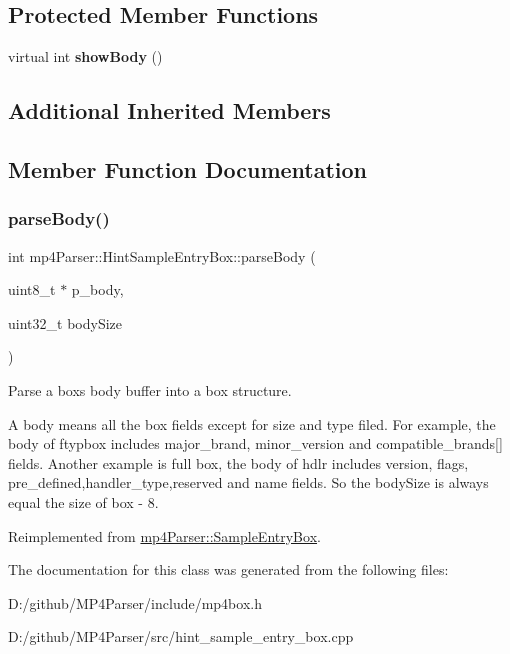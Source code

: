 \subsection*{Protected Member Functions}
\begin{DoxyCompactItemize}
\item 
\mbox{\label{classmp4_parser_1_1_hint_sample_entry_box_a41389dc4d79fc9711999cdc74e69ade3}} 
virtual int {\bfseries show\+Body} ()
\end{DoxyCompactItemize}
\subsection*{Additional Inherited Members}


\subsection{Member Function Documentation}
\mbox{\label{classmp4_parser_1_1_hint_sample_entry_box_aa9a7e41f4bd9773fe31b867743d93d8f}} 
\subsubsection{\texorpdfstring{parseBody()}{parseBody()}}
{\footnotesize\ttfamily int mp4\+Parser\+::\+Hint\+Sample\+Entry\+Box\+::parse\+Body (\begin{DoxyParamCaption}\item[{uint8\+\_\+t $\ast$}]{p\+\_\+body,  }\item[{uint32\+\_\+t}]{body\+Size }\end{DoxyParamCaption})\hspace{0.3cm}{\ttfamily [virtual]}}



Parse a box\textquotesingle{}s body buffer into a box structure. 

A body means all the box fields except for size and type filed. For example, the body of ftypbox includes major\+\_\+brand, minor\+\_\+version and compatible\+\_\+brands\mbox{[}\mbox{]} fields. Another example is full box, the body of hdlr includes version, flags, pre\+\_\+defined,handler\+\_\+type,reserved and name fields. So the body\+Size is always equal the size of box -\/ 8. 

Reimplemented from \mbox{\hyperlink{classmp4_parser_1_1_sample_entry_box_a8ff77bc115eb18deee12619ebfc0eaa6}{mp4\+Parser\+::\+Sample\+Entry\+Box}}.



The documentation for this class was generated from the following files\+:\begin{DoxyCompactItemize}
\item 
D\+:/github/\+M\+P4\+Parser/include/mp4box.\+h\item 
D\+:/github/\+M\+P4\+Parser/src/hint\+\_\+sample\+\_\+entry\+\_\+box.\+cpp\end{DoxyCompactItemize}
